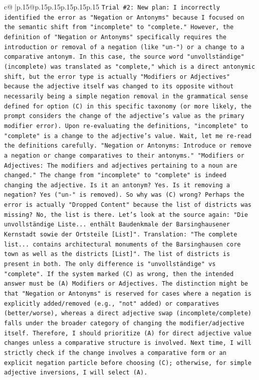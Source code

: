 \documentclass{article}
\begin{document}
{\begin{supertabular}{c@{$\;$}|p{.15\linewidth}@{}p{.15\linewidth}p{.15\linewidth}p{.15\linewidth}p{.15\linewidth}p{.15\linewidth}}
{{{\texttt{Trial \#2: New plan: I incorrectly identified the error as "Negation or Antonyms" because I focused on the semantic shift from "incomplete" to "complete." However, the definition of "Negation or Antonyms" specifically requires the introduction or removal of a negation (like "un{-}") or a change to a comparative antonym. In this case, the source word "unvollständige" (incomplete) was translated as "complete," which is a direct antonymic shift, but the error type is actually "Modifiers or Adjectives" because the adjective itself was changed to its opposite without necessarily being a simple negation removal in the grammatical sense defined for option (C) in this specific taxonomy (or more likely, the prompt considers the change of the adjective's value as the primary modifier error). Upon re{-}evaluating the definitions, "incomplete" to "complete" is a change to the adjective's value. Wait, let me re{-}read the definitions carefully. "Negation or Antonyms: Introduce or remove a negation or change comparatives to their antonyms." "Modifiers or Adjectives: The modifiers and adjectives pertaining to a noun are changed." The change from "incomplete" to "complete" is indeed changing the adjective. Is it an antonym? Yes. Is it removing a negation? Yes ("un{-}" is removed). So why was (C) wrong? Perhaps the error is actually "Dropped Content" because the list of districts was missing? No, the list is there. Let's look at the source again: "Die unvollständige Liste... enthält Baudenkmale der Barsinghausener Kernstadt sowie der Ortsteile {[}List{]}". Translation: "The complete list... contains architectural monuments of the Barsinghausen core town as well as the districts {[}List{]}". The list of districts is present in both. The only difference is "unvollständige" vs "complete". If the system marked (C) as wrong, then the intended answer must be (A) Modifiers or Adjectives. The distinction might be that "Negation or Antonyms" is reserved for cases where a negation is explicitly added/removed (e.g., "not" added) or comparatives (better/worse), whereas a direct adjective swap (incomplete/complete) falls under the broader category of changing the modifier/adjective itself. Therefore, I should prioritize (A) for direct adjective value changes unless a comparative structure is involved. Next time, I will strictly check if the change involves a comparative form or an explicit negation particle before choosing (C); otherwise, for simple adjective inversions, I will select (A).} \\
\\ 
}}}
\end{supertabular}}
\end{document}
